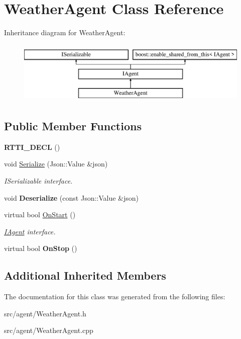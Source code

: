 \hypertarget{class_weather_agent}{}\section{Weather\+Agent Class Reference}
\label{class_weather_agent}
Inheritance diagram for Weather\+Agent\+:\begin{figure}[H]
\begin{center}
\leavevmode
\includegraphics[height=3.000000cm]{class_weather_agent}
\end{center}
\end{figure}
\subsection*{Public Member Functions}
\begin{DoxyCompactItemize}
\item 
\mbox{\label{class_weather_agent_a183fc6f9c0fc7d5ab2dfa6fd59841c54}} 
{\bfseries R\+T\+T\+I\+\_\+\+D\+E\+CL} ()
\item 
\mbox{\label{class_weather_agent_aa95f4faad234c6f474f6e15d0937a711}} 
void \hyperlink{class_weather_agent_aa95f4faad234c6f474f6e15d0937a711}{Serialize} (Json\+::\+Value \&json)
\begin{DoxyCompactList}\small\item\em I\+Serializable interface. \end{DoxyCompactList}\item 
\mbox{\label{class_weather_agent_a05f2834b8c0d1e5a2086f871b87f284c}} 
void {\bfseries Deserialize} (const Json\+::\+Value \&json)
\item 
\mbox{\label{class_weather_agent_aa659c5ccf82be7d8b06bb0d288d1d827}} 
virtual bool \hyperlink{class_weather_agent_aa659c5ccf82be7d8b06bb0d288d1d827}{On\+Start} ()
\begin{DoxyCompactList}\small\item\em \hyperlink{class_i_agent}{I\+Agent} interface. \end{DoxyCompactList}\item 
\mbox{\label{class_weather_agent_a594f1da5eab873f8d0900d9cc394b843}} 
virtual bool {\bfseries On\+Stop} ()
\end{DoxyCompactItemize}
\subsection*{Additional Inherited Members}


The documentation for this class was generated from the following files\+:\begin{DoxyCompactItemize}
\item 
src/agent/Weather\+Agent.\+h\item 
src/agent/Weather\+Agent.\+cpp\end{DoxyCompactItemize}

